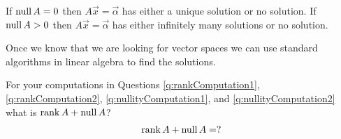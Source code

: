 \begin{corollary}
  If $\operatorname{null} A = 0$ then $A \vec{x} = \vec{\alpha}$ has either a unique solution or no solution.
  If $\operatorname{null} A > 0$ then $A \vec{x} = \vec{\alpha}$ has either infinitely many solutions or no solution.
\end{corollary}

Once we know that we are looking for vector spaces we can use standard algorithms in linear algebra to find the solutions.

\begin{qbox}
  For your computations in Questions \ref{q:rankComputation1}, \ref{q:rankComputation2}, \ref{q:nullityComputation1}, and \ref{q:nullityComputation2} what is $\operatorname{rank} A + \operatorname{null} A$?
  \begin{align*}
    \operatorname{rank} A + \operatorname{null} A = ?
  \end{align*}
\end{qbox}
